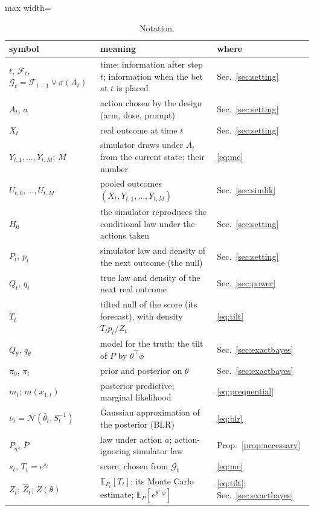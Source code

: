 \documentclass[12pt]{article}
\newcommand{\E}{\mathbb{E}}
\newcommand{\F}{\mathcal{F}}
\newcommand{\G}{\mathcal{G}}
\theoremstyle{remark}
\begin{document}
\begin{table}[h]
\centering
\caption{Notation. }
\label{tab:notation}
\begin{adjustbox}{max width=\textwidth}
\begin{tabular}{lll}
\toprule
symbol & meaning & where \\
\midrule
$t$, $\F_t$, $\G_t = \F_{t-1} \vee \sigma(A_t)$ & time; information after step $t$; information when the bet at $t$ is placed & Sec.~\ref{sec:setting} \\
$A_t$, $a$ & action chosen by the design (arm, dose, prompt) & Sec.~\ref{sec:setting} \\
$X_t$ & real outcome at time $t$ & Sec.~\ref{sec:setting} \\
$Y_{t,1}, \ldots, Y_{t,M}$; $M$ & simulator draws under $A_t$ from the current state; their number & \eqref{eq:mc} \\
$U_{t,0}, \ldots, U_{t,M}$ & pooled outcomes $(X_t, Y_{t,1}, \ldots, Y_{t,M})$ & Sec.~\ref{sec:simlik} \\
$H_0$ & the simulator reproduces the conditional law under the actions taken & Sec.~\ref{sec:setting} \\
\midrule
$P_t$, $p_t$ & simulator law and density of the next outcome (the null) & Sec.~\ref{sec:setting} \\
$Q_t$, $q_t$ & true law and density of the next real outcome & Sec.~\ref{sec:power} \\
$\tilde T_t$ & tilted null of the score (its forecast), with density $T_t p_t / Z_t$ & \eqref{eq:tilt} \\
$Q_\theta$, $q_\theta$ & model for the truth: the tilt of $P$ by $\theta^\top\phi$ & Sec.~\ref{sec:exactbayes} \\
$\pi_0$, $\pi_t$ & prior and posterior on $\theta$ & Sec.~\ref{sec:exactbayes} \\
$m_t$; $m(x_{1:t})$ & posterior predictive; marginal likelihood & \eqref{eq:prequential} \\
$\nu_t = \mathcal N(\bar\theta_t, S_t^{-1})$ & Gaussian approximation of the posterior (BLR) & \eqref{eq:blr} \\
$P_a$, $\bar P$ & law under action $a$; action-ignoring simulator law & Prop.~\ref{prop:necessary} \\
\midrule
$s_t$, $T_t = e^{s_t}$ & score, chosen from $\G_t$ & \eqref{eq:mc} \\
$Z_t$; $\widehat Z_t$; $Z(\theta)$ & $\E_{P_t}[T_t]$; its Monte Carlo estimate; $\E_P[e^{\theta^\top\phi}]$ & \eqref{eq:tilt}; Sec.~\ref{sec:exactbayes} \\

\end{tabular}
\end{adjustbox}
\end{table}
\end{document}
